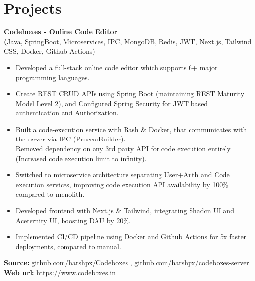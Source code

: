 \documentclass[9.5pt,a4paper]{article}
\begin{document}
\section*{Projects}
\noindent \textbf{Codeboxes - Online Code Editor} \\
\textbf(Java, SpringBoot, Microservices, IPC, MongoDB, Redis, JWT, Next.js, Tailwind CSS, Docker, Github Actions)
\begin{itemize}[left=0.4cm, itemsep=-2pt, topsep=3pt, partopsep=0pt]
  \setlength{\rightskip}{0.05\textwidth}
  \item Developed a full-stack online code editor which supports 6+ major programming languages.
  \item Create REST CRUD APIs using Spring Boot (maintaining REST Maturity Model Level 2), and Configured Spring Security for JWT based authentication and Authorization.
  \item Built a code-execution service with Bash \& Docker, that communicates with the server via IPC (ProcessBuilder).\\Removed dependency on any 3rd party API for code execution entirely (Increased code execution limit to infinity).
  \item Switched to microservice architecture separating User+Auth and Code execution services, improving code execution API availability by 100\% compared to monolith.
  \item Developed frontend with Next.js \& Tailwind, integrating Shadcn UI and Aceternity UI, boosting DAU by 20\%.
  \item Implemented CI/CD pipeline using Docker and Github Actions for 5x faster deployments, compared to manual.
\end{itemize}
\begin{adjustwidth}{2em}{0pt}
\textbf{Source:} \href{https://github.com/harshpx/Codeboxes}{github.com/harshpx/Codeboxes} , \quad
\href{https://github.com/harshpx/codeboxes-server}{github.com/harshpx/codeboxes-server} \\
\textbf{Web url:} \href{https://www.codeboxes.in/}{https://www.codeboxes.in}
\end{adjustwidth}

\vspace*{0.6em}
\end{document}
